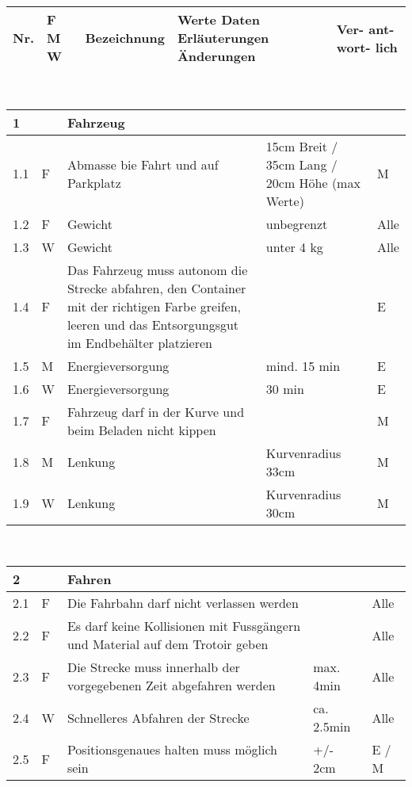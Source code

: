 \begin{center}
\begin{tabular}{|p{1cm}|p{0.5cm}|p{5cm}|p{5cm}|p{1.5cm}|}\hline
\textbf{Nr.} & \textbf{F M W} & \textbf{Bezeichnung} & \textbf{Werte Daten Erläuterungen Änderungen} & \textbf{Ver- ant- wort- lich}\\\hline
\end{tabular}\\[0.3cm]
\begin{tabular}{|p{1cm}|p{0.5cm}|p{5cm}|p{5cm}|p{1.5cm}|}\hline
 \textbf{1} & & \textbf{Fahrzeug} & & \\\hline
 1.1 & F & Abmasse bie Fahrt und auf Parkplatz & 15cm Breit / 35cm Lang / 20cm Höhe (max Werte) & M\\ \hline
 1.2 & F & Gewicht & unbegrenzt & Alle\\\hline
 1.3 & W & Gewicht & unter 4 kg & Alle\\\hline
 1.4 & F & Das Fahrzeug muss autonom die Strecke abfahren, den Container mit der richtigen Farbe greifen, leeren und das Entsorgungsgut im Endbehälter platzieren   & & E\\\hline
 1.5 & M & Energieversorgung & mind. 15 min & E \\\hline
 1.6 & W & Energieversorgung & 30 min & E \\\hline
 1.7 & F & Fahrzeug darf in der Kurve und beim Beladen nicht kippen & & M \\\hline
 1.8 & M & Lenkung & Kurvenradius 33cm & M \\\hline
 1.9 & W & Lenkung & Kurvenradius 30cm & M \\\hline
\end{tabular}\\[0.3cm]
\begin{tabular}{|p{1cm}|p{0.5cm}|p{5cm}|p{5cm}|p{1.5cm}|}\hline
 \textbf{2} & & \textbf{Fahren} & & \\\hline
 2.1 & F & Die Fahrbahn darf nicht verlassen werden & & Alle\\\hline
 2.2 & F & Es darf keine Kollisionen mit Fussgängern und Material auf dem Trotoir geben & & Alle \\\hline
 2.3 & F & Die Strecke muss innerhalb der vorgegebenen Zeit abgefahren werden & max. 4min & Alle\\\hline
 2.4 & W & Schnelleres Abfahren der Strecke & ca. 2.5min & Alle\\\hline
 2.5 & F & Positionsgenaues halten muss möglich sein & +/- 2cm & E / M\\\hline

\end{tabular}
\end{center}
